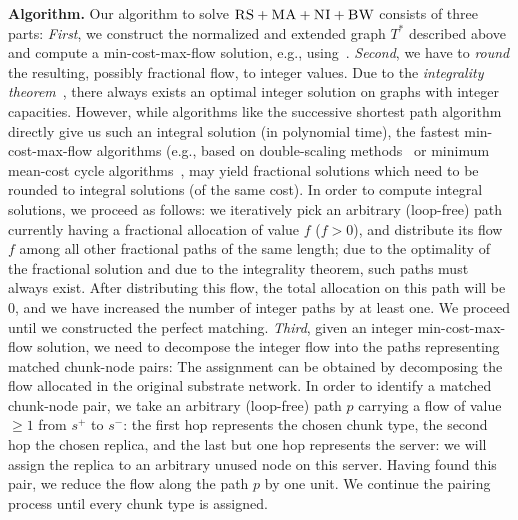 \documentclass[conference,10pt]{IEEEtran}
\newcommand{\Source}{\ensuremath{s^{+}}}
\newcommand{\Sink}{\ensuremath{s^{-}}}
\newcommand{\CC}{\textsc{NI}}
\newcommand{\RS}{\textsc{RS}}
\newcommand{\BW}{\textsc{BW}}
\newcommand{\MA}{\textsc{MA}}
\newcommand{\Tree}{\ensuremath{T}}
\begin{document}
\textbf{Algorithm.}
Our algorithm to solve $\RS+\MA+\CC+\BW$ consists of three parts:
\emph{First}, we construct the normalized and extended graph $\Tree^*$
described above and compute
a min-cost-max-flow solution, e.g.,
using~\cite{mincostmaxflow-1,mincostmaxflow-2}.
\emph{Second}, we have to \emph{round} the resulting, possibly fractional flow, to
integer values. Due to the \emph{integrality theorem}~\cite{flow-book},
there always exists an optimal integer solution on graphs with integer capacities.
However, while algorithms like the successive shortest path algorithm~\cite{successive_shortest_path_complexity}
directly give us such an integral solution (in polynomial time), the fastest min-cost-max-flow algorithms (e.g., based on double-scaling
methods~\cite{mincostmaxflow-1} or minimum mean-cost cycle
algorithms~\cite{mincostmaxflow-2}, may yield fractional solutions
which need to be rounded to integral solutions (of the same cost).
In order to compute integral solutions, we proceed as follows: we iteratively
pick an arbitrary (loop-free) path
currently having a fractional allocation of value $f$ ($f>0$), and distribute its flow $f$
among all other fractional paths of the same length; due to the optimality of the fractional solution
and due to the integrality theorem, such paths must always exist. After distributing this flow,
the total allocation on this path will be 0, and we have increased the number of
integer paths by at least one. We proceed until we constructed the perfect
matching.
\emph{Third}, given an integer min-cost-max-flow solution, we need to decompose
the integer flow into the paths
representing matched chunk-node pairs:
The assignment can be obtained by decomposing the flow allocated in the
original substrate network. In order to identify a matched chunk-node pair,
we take an arbitrary (loop-free) path $p$ carrying a flow of value  $\geq 1$ from $\Source$ to $\Sink$:
the first hop represents the chosen chunk type, the second hop the chosen
replica, and the last but one hop represents the server: we will assign
the replica to an arbitrary unused node on this server.
Having found this pair, we reduce the flow
along the path $p$ by one unit.
We continue the pairing process until every chunk type is assigned.
\end{document}
